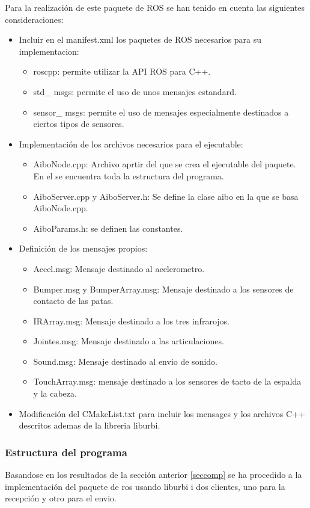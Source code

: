\documentclass[12pt,a4paper,final,twoside]{article}
\begin{document}
Para la realización de este paquete de ROS se han tenido en cuenta las siguientes consideraciones:
\begin{itemize}
\item Incluir en el manifest.xml los paquetes de ROS necesarios para su implementacion:
\begin{itemize}
\item roscpp: permite utilizar la API ROS para C++.
\item std\_ msgs: permite el uso de unos mensajes estandard.
\item sensor\_ msgs: permite el uso de mensajes especialmente destinados a ciertos tipos de sensores.
\end{itemize}
\item Implementación de los archivos necesarios para el ejecutable:
\begin{itemize}
\item AiboNode.cpp: Archivo aprtir del que se crea el ejecutable del paquete. En el se encuentra toda la estructura del programa.
\item AiboServer.cpp y AiboServer.h: Se define la clase aibo en la que se basa AiboNode.cpp.
\item AiboParams.h: se definen las constantes.
\end{itemize} 
\item Definición de los mensajes propios:
\begin{itemize}
\item Accel.msg: Mensaje destinado al acelerometro.
\item Bumper.msg y BumperArray.msg: Mensaje destinado a los sensores de contacto de las patas.
\item IRArray.msg: Mensaje destinado a los tres infrarojos.
\item Jointes.msg: Mensaje destinado a las articulaciones.
\item Sound.msg: Mensaje destinado al envio de sonido.
\item TouchArray.msg: mensaje destinado a los sensores de tacto de la espalda y la cabeza.
\end{itemize}
\item Modificación del CMakeList.txt para incluir los mensages y los archivos C++ descritos ademas de la libreria liburbi.
\end{itemize}

\subsubsection{Estructura del programa}
Basandose en los resultados de la sección anterior \ref{seccomp} se ha procedido a la implementación del paquete de ros usando liburbi i dos clientes, uno para la recepción  y otro para el envio.
\end{document}
